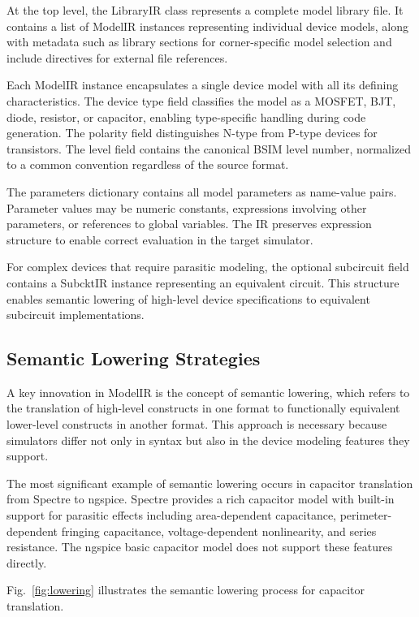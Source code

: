 \documentclass[conference]{IEEEtran}
\begin{document}
At the top level, the LibraryIR class represents a complete model library file. It contains a list of ModelIR instances representing individual device models, along with metadata such as library sections for corner-specific model selection and include directives for external file references.

Each ModelIR instance encapsulates a single device model with all its defining characteristics. The device type field classifies the model as a MOSFET, BJT, diode, resistor, or capacitor, enabling type-specific handling during code generation. The polarity field distinguishes N-type from P-type devices for transistors. The level field contains the canonical BSIM level number, normalized to a common convention regardless of the source format.

The parameters dictionary contains all model parameters as name-value pairs. Parameter values may be numeric constants, expressions involving other parameters, or references to global variables. The IR preserves expression structure to enable correct evaluation in the target simulator.

For complex devices that require parasitic modeling, the optional subcircuit field contains a SubcktIR instance representing an equivalent circuit. This structure enables semantic lowering of high-level device specifications to equivalent subcircuit implementations.

\subsection{Semantic Lowering Strategies}

A key innovation in ModelIR is the concept of semantic lowering, which refers to the translation of high-level constructs in one format to functionally equivalent lower-level constructs in another format. This approach is necessary because simulators differ not only in syntax but also in the device modeling features they support.

The most significant example of semantic lowering occurs in capacitor translation from Spectre to ngspice. Spectre provides a rich capacitor model with built-in support for parasitic effects including area-dependent capacitance, perimeter-dependent fringing capacitance, voltage-dependent nonlinearity, and series resistance. The ngspice basic capacitor model does not support these features directly.

Fig.~\ref{fig:lowering} illustrates the semantic lowering process for capacitor translation.
\end{document}
